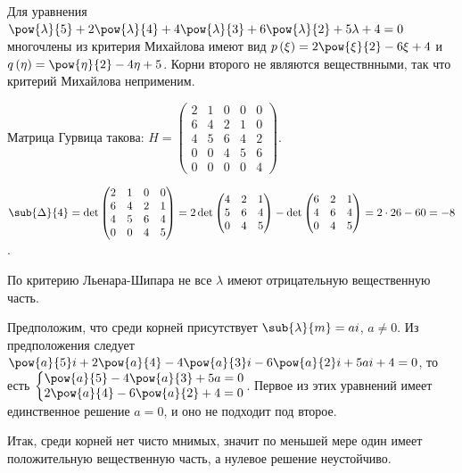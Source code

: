 \documentclass[a5paper,10pt]{article}
\begin{document}
Для уравнения
$\pow{\lambda}{5} + 2\pow{\lambda}{4} + 4\pow{\lambda}{3} + 6\pow{\lambda}{2} + 5\lambda + 4 = 0$ 
многочлены из критерия Михайлова имеют вид 
$p\br{\xi} = 2\pow{\xi}{2} - 6\xi + 4$ и $q\br{\eta} = \pow{\eta}{2} - 4\eta + 5$.
Корни второго не являются веществнными, так что критерий Михайлова неприменим.

Матрица Гурвица такова:
$H = \begin{pmatrix}
2 & 1 & 0 & 0 & 0
\\ 6 & 4 & 2 & 1 & 0
\\ 4 & 5 & 6 & 4 & 2 
\\ 0 & 0 & 4 & 5 & 6
\\ 0 & 0 & 0 & 0 & 4
\end{pmatrix}$.

$\sub{\Delta}{4} = \det\begin{pmatrix}
2 & 1 & 0 & 0 
\\ 6 & 4 & 2 & 1
\\ 4 & 5 & 6 & 4
\\ 0 & 0 & 4 & 5
\end{pmatrix} 
= 2 \det \begin{pmatrix}
4 & 2 & 1
\\ 5 & 6 & 4
\\ 0 & 4 & 5
\end{pmatrix}
-\det \begin{pmatrix}
6 & 2 & 1
\\ 4 & 6 & 4
\\ 0 & 4 & 5
\end{pmatrix}
= 2 \cdot 26 - 60 = -8$.

По критерию Льенара-Шипара не все $\lambda$ имеют отрицательную вещественную часть.

Предположим, что среди корней присутствует $\sub{\lambda}{m} = ai$, $a \ne 0$. Из предположения следует
$\pow{a}{5} i + 2\pow{a}{4} - 4\pow{a}{3} i - 6\pow{a}{2} i + 5ai + 4 = 0$,
то есть $\tsys{\pow{a}{5} - 4\pow{a}{3} + 5a = 0 \\ 2\pow{a}{4} - 6\pow{a}{2} + 4 = 0}$.
Первое из этих уравнений имеет единственное решение $a = 0$, и оно не подходит под второе.

Итак, среди корней нет чисто мнимых, значит по меньшей мере один имеет 
положительную вещественную часть, а нулевое решение неустойчиво.
\end{document}
